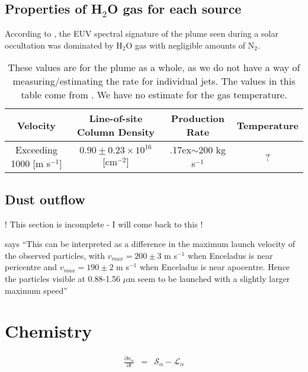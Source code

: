 \documentclass[12pt, letterpaper]{article}
\newcommand{\tild}{\raise.17ex\hbox{$\scriptstyle\sim$}}
\begin{document}
\subsection{Properties of H$_{2}$O gas for each source}
According to \citet{Hansen11}, the EUV spectral signature of the plume seen during a solar occultation was dominated by H$_{2}$O gas with negligible amounts of N$_{2}$.
\renewcommand{\arraystretch}{1.5}
\begin{table}[h!]
\centering
\label{label 1}
\caption{These values are for the plume as a whole, as we do not have a way of measuring/estimating the rate for individual jets. The values in this table come from \citep{Hansen11}. We have no estimate for the gas temperature.}
\begin{tabular}[l]{ c c c c } 
\hline
Velocity & Line-of-site Column Density & Production Rate & Temperature \\
\hline
\hline
Exceeding 1000 [m s$^{-1}$] & $0.90 \pm 0.23 \times 10^{16}$ [cm$^{-2}$] & \tild 200 kg s$^{-1}$ & ? \\
\end{tabular}
\end{table}

\subsection{Dust outflow}

! This section is incomplete - I will come back to this !

\citet{Hedman13} says \enquote{This can be interpreted as a difference in the maximum launch velocity of the observed particles, with $v_{max} = 200 \pm 3$ m s$^{-1}$ when Enceladus is near pericentre and $v_{max} = 190 \pm 2$ m s$^{-1}$ when Enceladus is near apocentre. Hence the particles visible at 0.88-1.56 $\mu$m seem to be launched with a slightly larger maximum speed}


\section{Chemistry}
\label{sec:2}

\begin{eqnarray}
\frac{\partial n_{\alpha}}{\partial t} & = & \mathcal{S}_{\alpha} - \mathcal{L}_{\alpha}
\end{eqnarray}
\end{document}
